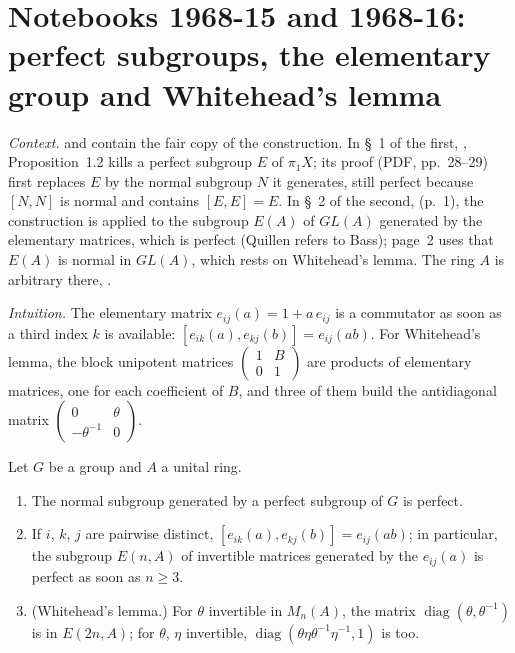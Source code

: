 \section[Notebooks 1968-15 and 1968-16: perfect subgroups, the elementary group and Whitehead's lemma]{Notebooks 1968-15 and 1968-16: perfect subgroups, the elementary group and Whitehead's lemma\protect{}}\label{sec:quillen-1968-15}

\emph{Context.}  and  contain the fair copy of the  construction. In \S~1 of the first, , Proposition~1.2 kills a perfect subgroup $E$ of $\pi_1 X$; its proof (PDF, pp.~28--29) first replaces $E$ by the normal subgroup $N$ it generates, still perfect because $[N, N]$ is normal and contains $[E, E] = E$. In \S~2 of the second,  (p.~1), the construction is applied to the subgroup $E(A)$ of $GL(A)$ generated by the elementary matrices, which is perfect (Quillen refers to Bass); page~2 uses that $E(A)$ is normal in $GL(A)$, which rests on Whitehead's lemma. The ring $A$ is arbitrary there, .

\emph{Intuition.} The elementary matrix $e_{ij}(a) = 1 + a\,e_{ij}$ is a commutator as soon as a third index $k$ is available: $[e_{ik}(a), e_{kj}(b)] = e_{ij}(ab)$. For Whitehead's lemma, the block unipotent matrices $\left(\begin{smallmatrix} 1 & B \\ 0 & 1 \end{smallmatrix}\right)$ are products of elementary matrices, one for each coefficient of $B$, and three of them build the antidiagonal matrix $\left(\begin{smallmatrix} 0 & \theta \\ -\theta^{-1} & 0 \end{smallmatrix}\right)$.

\begin{encadre}
\begin{theoreme}\label{thm:quillen-1968-15}
Let $G$ be a group and $A$ a unital ring.
\begin{enumerate}
\item[a)] The normal subgroup generated by a perfect subgroup of $G$ is perfect.
\item[b)] If $i$, $k$, $j$ are pairwise distinct, $[e_{ik}(a), e_{kj}(b)] = e_{ij}(ab)$; in particular, the subgroup $E(n, A)$ of invertible matrices generated by the $e_{ij}(a)$ is perfect as soon as $n \ge 3$.
\item[c)] (Whitehead's lemma.) For $\theta$ invertible in $M_n(A)$, the matrix $\operatorname{diag}(\theta, \theta^{-1})$ is in $E(2n, A)$; for $\theta$, $\eta$ invertible, $\operatorname{diag}(\theta\eta\theta^{-1}\eta^{-1}, 1)$ is too.
\end{enumerate}
\end{theoreme}
\end{encadre}

